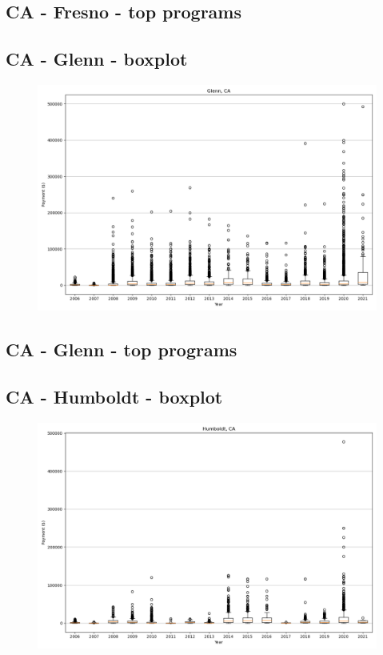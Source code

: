 \subsection*{CA - Fresno - top programs}

\newpage
\subsection*{CA - Glenn - boxplot}
\begin{figure}[h]
\centering
\includegraphics[width=7in]{../output/boxplots/counties/Glenn-CA_boxplot.png}
\end{figure}


\subsection*{CA - Glenn - top programs}

\newpage
\subsection*{CA - Humboldt - boxplot}
\begin{figure}[h]
\centering
\includegraphics[width=7in]{../output/boxplots/counties/Humboldt-CA_boxplot.png}
\end{figure}


